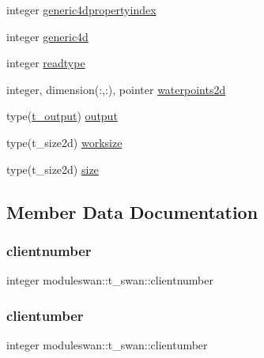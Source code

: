 \begin{DoxyCompactItemize}
integer \mbox{\hyperlink{structmoduleswan_1_1t__swan_a7c188d9e5eb67634a17ed3edb3c0612e}{generic4dpropertyindex}}
\item 
integer \mbox{\hyperlink{structmoduleswan_1_1t__swan_ad726c7c4311b3779e774b06a86bf76cb}{generic4d}}
\item 
integer \mbox{\hyperlink{structmoduleswan_1_1t__swan_ad01cb4722a69c9752ff4dbd93d5fd88a}{readtype}}
\item 
integer, dimension(\+:,\+:), pointer \mbox{\hyperlink{structmoduleswan_1_1t__swan_ac9db1bd02a876f491cffbfcd30c45612}{waterpoints2d}}
\item 
type(\mbox{\hyperlink{structmoduleswan_1_1t__output}{t\+\_\+output}}) \mbox{\hyperlink{structmoduleswan_1_1t__swan_a330ac0f9c129db8728691f396ce88ad1}{output}}
\item 
type(t\+\_\+size2d) \mbox{\hyperlink{structmoduleswan_1_1t__swan_afa74d92538b826dbe79fc573a1a6bf9d}{worksize}}
\item 
type(t\+\_\+size2d) \mbox{\hyperlink{structmoduleswan_1_1t__swan_aa1f8375a965caec34c99f714248240b8}{size}}
\end{DoxyCompactItemize}


\subsection{Member Data Documentation}
\mbox{\label{structmoduleswan_1_1t__swan_aa430fc89c288d1393c57c9ebd5ec7ba4}} 
\subsubsection{\texorpdfstring{clientnumber}{clientnumber}}
{\footnotesize\ttfamily integer moduleswan\+::t\+\_\+swan\+::clientnumber\hspace{0.3cm}{\ttfamily [private]}}

\mbox{\label{structmoduleswan_1_1t__swan_a3143a602a44d17ae29c022d13919c7d9}} 
\subsubsection{\texorpdfstring{clientumber}{clientumber}}
{\footnotesize\ttfamily integer moduleswan\+::t\+\_\+swan\+::clientumber\hspace{0.3cm}{\ttfamily [private]}}

